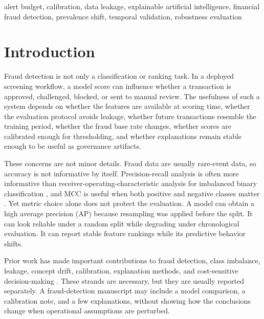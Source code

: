 \documentclass{ieeeaccess}
\begin{document}
\begin{keywords}
alert budget, calibration, data leakage, explainable artificial intelligence, financial fraud detection, prevalence shift, temporal validation, robustness evaluation
\end{keywords}

\titlepgskip=-15pt
\maketitle
\makeatletter
\ps@headings
\pagestyle{headings}
\makeatother

\section{Introduction}
Fraud detection is not only a classification or ranking task. In a deployed screening workflow, a model score can influence whether a transaction is approved, challenged, blocked, or sent to manual review. The usefulness of such a system depends on whether the features are available at scoring time, whether the evaluation protocol avoids leakage, whether future transactions resemble the training period, whether the fraud base rate changes, whether scores are calibrated enough for thresholding, and whether explanations remain stable enough to be useful as governance artifacts.

These concerns are not minor details. Fraud data are usually rare-event data, so accuracy is not informative by itself. Precision-recall analysis is often more informative than receiver-operating-characteristic analysis for imbalanced binary classification \cite{saito2015precision,davis2006pr}, and MCC is useful when both positive and negative classes matter \cite{chicco2020mcc}. Yet metric choice alone does not protect the evaluation. A model can obtain a high average precision (AP) because resampling was applied before the split. It can look reliable under a random split while degrading under chronological evaluation. It can report stable feature rankings while its predictive behavior shifts.

Prior work has made important contributions to fraud detection, class imbalance, leakage, concept drift, calibration, explanation methods, and cost-sensitive decision-making \cite{bolton2002fraud,dalpozzolo2014lessons,bahnsen2013cost,bahnsen2016feature,kaufman2012leakage,gama2014drift,chawla2002smote,niculescu2005predicting,guo2017calibration,ribeiro2016lime,lundberg2017shap}. These strands are necessary, but they are usually reported separately. A fraud-detection manuscript may include a model comparison, a calibration note, and a few explanations, without showing how the conclusions change when operational assumptions are perturbed.
\end{document}
